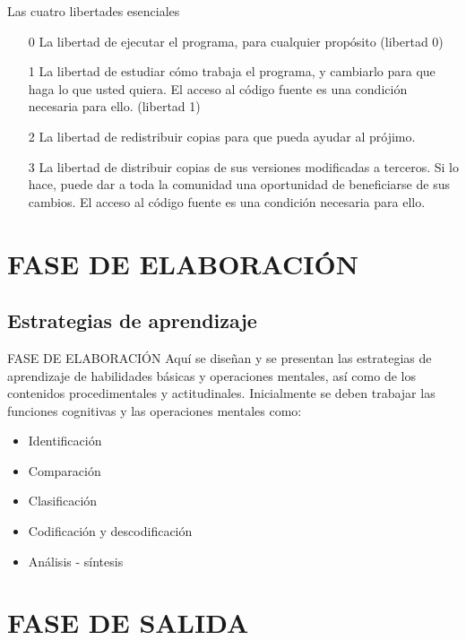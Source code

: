 \documentclass{beamer}
\begin{document}
\begin{frame}{Las cuatro libertades esenciales}
\begin{itemize}
  \item[0] La libertad de ejecutar el programa, para cualquier propósito (libertad 0)
  \pause
  \item[1] La libertad de estudiar cómo trabaja el programa, y cambiarlo para que haga lo que usted quiera. El acceso al código fuente es una condición necesaria para ello. (libertad 1)
  \pause
  \item[2] La libertad de redistribuir copias para que pueda ayudar al prójimo.
  \pause
  \item[3] La libertad de distribuir copias de sus versiones modificadas a terceros. Si lo hace, puede dar a toda la comunidad una oportunidad de beneficiarse de sus cambios. El acceso al código fuente es una condición necesaria para ello.
  \end{itemize}
\end{frame}

\section[FASE DE ELABORACIÓN]{FASE DE ELABORACIÓN}
\subsection{Estrategias de aprendizaje}
\begin{frame}{FASE DE ELABORACIÓN}
  Aquí se diseñan y se presentan las estrategias de aprendizaje de habilidades básicas y operaciones mentales, así como de los contenidos procedimentales y actitudinales. Inicialmente se deben trabajar las funciones cognitivas y las operaciones mentales como:\pause
  \begin{itemize}
    \item Identificación\pause
    \item Comparación\pause
    \item Clasificación\pause
    \item Codificación y descodificación\pause
    \item Análisis - síntesis
  \end{itemize}
\end{frame}

\section{FASE DE SALIDA}
\end{document}
